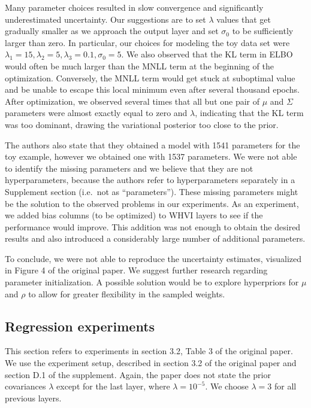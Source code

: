\documentclass[11pt, twocolumn]{article}
\begin{document}
    Many parameter choices resulted in slow convergence and significantly underestimated uncertainty.
    Our suggestions are to set $\lambda$ values that get gradually smaller as we approach the output layer and set $\sigma_0$ to be sufficiently larger than zero.
    In particular, our choices for modeling the toy data set were $\lambda_1=15, \lambda_2=5,\lambda_3=0.1, \sigma_0=5$.
    We also observed that the KL term in ELBO would often be much larger than the MNLL term at the beginning of the optimization. Conversely, the MNLL term would get stuck at suboptimal value and be unable to escape this local minimum even after several thousand epochs.
    After optimization, we observed several times that all but one pair of $\mu$ and $\Sigma$ parameters were almost exactly equal to zero and $\lambda$, indicating that the KL term was too dominant, drawing the variational posterior too close to the prior.

    The authors also state that they obtained a model with 1541 parameters for the toy example, however we obtained one with 1537 parameters.
    We were not able to identify the missing parameters and we believe that they are not hyperparameters, because the authors refer to hyperparameters separately in a Supplement section (i.e.\ not as ``parameters'').
    These missing parameters might be the solution to the observed problems in our experiments.
    As an experiment, we added bias columns (to be optimized) to WHVI layers to see if the performance would improve.
    This addition was not enough to obtain the desired results and also introduced a considerably large number of additional parameters.

    To conclude, we were not able to reproduce the uncertainty estimates, visualized in Figure 4 of the original paper.
    We suggest further research regarding parameter initialization.
    A possible solution would be to explore hyperpriors for $\mu$ and $\rho$ to allow for greater flexibility in the sampled weights.

    \subsection{Regression experiments}
    This section refers to experiments in section 3.2, Table 3 of the original paper.
    We use the experiment setup, described in section 3.2 of the original paper and section D.1 of the supplement.
    Again, the paper does not state the prior covariances $\lambda$ except for the last layer, where $\lambda = 10^{-5}$.
    We choose $\lambda = 3$ for all previous layers.
\end{document}
